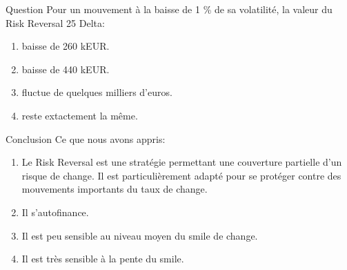 \documentclass{beamer}
\begin{document}
\begin{frame}{Question}
Pour un mouvement à la baisse de 1 \% de sa volatilité, la valeur du Risk Reversal 25 Delta:\\
\begin{enumerate}
\item baisse de 260 kEUR.
\item baisse de 440 kEUR.
\item fluctue de quelques milliers d'euros.
\item reste extactement la même.
\end{enumerate}
\end{frame}

\begin{frame}{Conclusion}
Ce que nous avons appris:
\begin{enumerate}
\item<2-> Le Risk Reversal est une stratégie permettant une couverture partielle d'un risque de change. Il est particulièrement adapté pour se protéger contre des mouvements importants du taux de change.
\item<3-> Il s'autofinance.
\item<4-> Il est peu sensible au niveau moyen du smile de change.
\item<5-> Il est très sensible à la pente du smile. 
\end{enumerate}
\end{frame}
\end{document}
